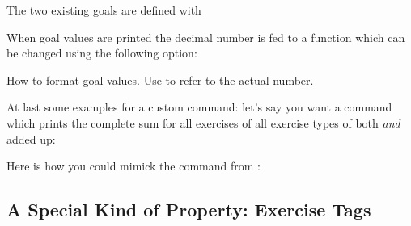 \documentclass{xsim-manual}
\begin{document}
The two existing goals are defined with
\begin{sourcecode}
\end{sourcecode}

When goal values are printed the decimal number is fed to a function which can
be changed using the following option:
\begin{options}
    How to format goal values.  Use  to refer to the actual number.
\end{options}

At last some examples for a custom command: let's say you want a command which
prints the complete sum for all exercises of all exercise types of both
 \emph{and}  added up:
\begin{sourcecode}
  \NewDocumentCommand{}
\end{sourcecode}
Here is how you could mimick the command  from
:
\begin{sourcecode}
  \NewDocumentCommand{}
\end{sourcecode}


\subsection[Exercise Tags]{A Special Kind of Property: Exercise Tags}\label{sec:tags}
\end{document}
